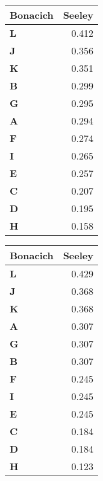 \begin{table}[!h]
\centering
\centering
\begin{tabular}[t]{>{}lr}
\toprule
Bonacich & \vphantom{1} Seeley\\
\midrule
\textbf{L} & 0.412\\
\textbf{J} & 0.356\\
\textbf{K} & 0.351\\
\textbf{B} & 0.299\\
\textbf{G} & 0.295\\
\textbf{A} & 0.294\\
\textbf{F} & 0.274\\
\textbf{I} & 0.265\\
\textbf{E} & 0.257\\
\textbf{C} & 0.207\\
\textbf{D} & 0.195\\
\textbf{H} & 0.158\\
\bottomrule
\end{tabular}
\centering
\begin{tabular}[t]{lr}
\toprule
\textbf{Bonacich} & Seeley\\
\midrule
\textbf{L} & 0.429\\
\textbf{J} & 0.368\\
\textbf{K} & 0.368\\
\textbf{A} & 0.307\\
\textbf{G} & 0.307\\
\textbf{B} & 0.307\\
\textbf{F} & 0.245\\
\textbf{I} & 0.245\\
\textbf{E} & 0.245\\
\textbf{C} & 0.184\\
\textbf{D} & 0.184\\
\textbf{H} & 0.123\\
\bottomrule
\end{tabular}
\end{table}
